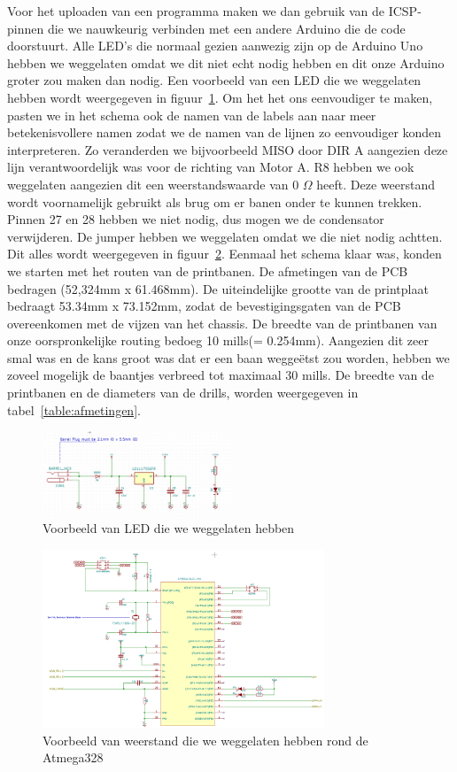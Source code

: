Voor het uploaden van een programma maken we dan gebruik van de ICSP-pinnen die we nauwkeurig verbinden met een andere Arduino die de code doorstuurt.  Alle LED's die normaal gezien aanwezig zijn op de Arduino Uno hebben we  weggelaten omdat we dit niet echt nodig hebben en dit onze Arduino groter zou maken dan nodig. Een voorbeeld van een LED die we weggelaten hebben wordt weergegeven in figuur~\ref{fig:regulator}. Om het het ons eenvoudiger te maken, pasten we in het schema ook de namen van de labels aan naar meer betekenisvollere namen zodat we de namen van de lijnen zo eenvoudiger konden interpreteren. Zo veranderden we bijvoorbeeld MISO door DIR A aangezien deze lijn verantwoordelijk was voor de richting van Motor A. R8 hebben we ook weggelaten aangezien dit een weerstandswaarde van 0 $\Omega$ heeft. Deze weerstand wordt voornamelijk gebruikt als brug om er banen onder te kunnen trekken. Pinnen 27 en 28 hebben we niet nodig, dus mogen we de condensator verwijderen. De jumper hebben we weggelaten omdat we die niet nodig achtten. Dit alles wordt weergegeven in figuur~\ref{fig:atmega}. Eenmaal het schema klaar was, konden we starten met het routen van de printbanen. De afmetingen van de PCB bedragen (52,324mm x 61.468mm). De uiteindelijke grootte van de printplaat bedraagt 53.34mm x 73.152mm, zodat de bevestigingsgaten van de PCB overeenkomen met de vijzen van het chassis.  De breedte van de printbanen van onze oorspronkelijke routing bedoeg 10 mills(= 0.254mm). Aangezien dit zeer smal was en de kans groot was dat er een baan wegge\"etst zou worden, hebben we zoveel mogelijk de baantjes verbreed tot maximaal 30 mills. De breedte van de printbanen en de diameters van de drills, worden weergegeven in tabel~\ref{table:afmetingen}.\\
\begin{figure}[h]
\centering
\includegraphics[width=0.5\textwidth]{Voltage_Regulator.png}
\caption{Voorbeeld van LED die we weggelaten hebben}
\label{fig:regulator}
\end{figure}

\begin{figure}[h]
\centering
\includegraphics[width=0.75\textwidth]{Atmega.png}
\caption{Voorbeeld van weerstand die we weggelaten hebben rond de Atmega328}
\label{fig:atmega}
\end{figure}

